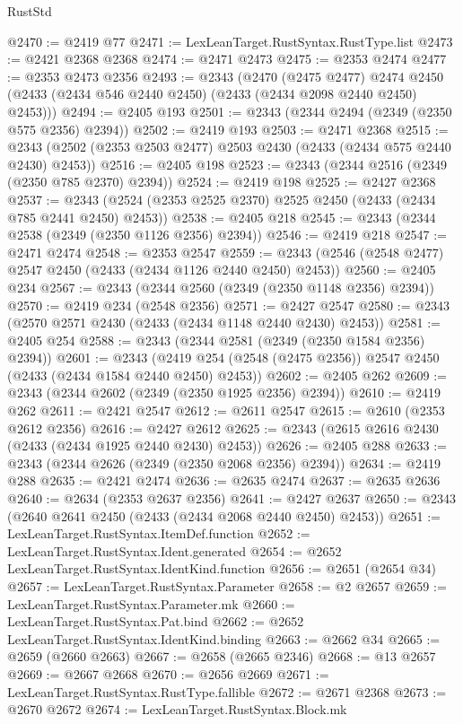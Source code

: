 \begin{lexlean}{RustStd}
\begin{coremodule}
@2470 := @2419 @77
@2471 := LexLeanTarget.RustSyntax.RustType.list
@2473 := @2421 @2368 @2368
@2474 := @2471 @2473
@2475 := @2353 @2474
@2477 := @2353 @2473 @2356
@2493 := @2343
    (@2470
      (@2475 @2477)
      @2474
      @2450
      (@2433 (@2434 @546 @2440 @2450) (@2433 (@2434 @2098 @2440 @2450) @2453)))
@2494 := @2405 @193
@2501 := @2343 (@2344 @2494 (@2349 (@2350 @575 @2356) @2394))
@2502 := @2419 @193
@2503 := @2471 @2368
@2515 := @2343 (@2502 (@2353 @2503 @2477) @2503 @2430 (@2433 (@2434 @575 @2440 @2430) @2453))
@2516 := @2405 @198
@2523 := @2343 (@2344 @2516 (@2349 (@2350 @785 @2370) @2394))
@2524 := @2419 @198
@2525 := @2427 @2368
@2537 := @2343 (@2524 (@2353 @2525 @2370) @2525 @2450 (@2433 (@2434 @785 @2441 @2450) @2453))
@2538 := @2405 @218
@2545 := @2343 (@2344 @2538 (@2349 (@2350 @1126 @2356) @2394))
@2546 := @2419 @218
@2547 := @2471 @2474
@2548 := @2353 @2547
@2559 := @2343 (@2546 (@2548 @2477) @2547 @2450 (@2433 (@2434 @1126 @2440 @2450) @2453))
@2560 := @2405 @234
@2567 := @2343 (@2344 @2560 (@2349 (@2350 @1148 @2356) @2394))
@2570 := @2419 @234 (@2548 @2356)
@2571 := @2427 @2547
@2580 := @2343 (@2570 @2571 @2430 (@2433 (@2434 @1148 @2440 @2430) @2453))
@2581 := @2405 @254
@2588 := @2343 (@2344 @2581 (@2349 (@2350 @1584 @2356) @2394))
@2601 := @2343
    (@2419 @254 (@2548 (@2475 @2356)) @2547 @2450 (@2433 (@2434 @1584 @2440 @2450) @2453))
@2602 := @2405 @262
@2609 := @2343 (@2344 @2602 (@2349 (@2350 @1925 @2356) @2394))
@2610 := @2419 @262
@2611 := @2421 @2547
@2612 := @2611 @2547
@2615 := @2610 (@2353 @2612 @2356)
@2616 := @2427 @2612
@2625 := @2343 (@2615 @2616 @2430 (@2433 (@2434 @1925 @2440 @2430) @2453))
@2626 := @2405 @288
@2633 := @2343 (@2344 @2626 (@2349 (@2350 @2068 @2356) @2394))
@2634 := @2419 @288
@2635 := @2421 @2474
@2636 := @2635 @2474
@2637 := @2635 @2636
@2640 := @2634 (@2353 @2637 @2356)
@2641 := @2427 @2637
@2650 := @2343 (@2640 @2641 @2450 (@2433 (@2434 @2068 @2440 @2450) @2453))
@2651 := LexLeanTarget.RustSyntax.ItemDef.function
@2652 := LexLeanTarget.RustSyntax.Ident.generated
@2654 := @2652 LexLeanTarget.RustSyntax.IdentKind.function
@2656 := @2651 (@2654 @34)
@2657 := LexLeanTarget.RustSyntax.Parameter
@2658 := @2 @2657
@2659 := LexLeanTarget.RustSyntax.Parameter.mk
@2660 := LexLeanTarget.RustSyntax.Pat.bind
@2662 := @2652 LexLeanTarget.RustSyntax.IdentKind.binding
@2663 := @2662 @34
@2665 := @2659 (@2660 @2663)
@2667 := @2658 (@2665 @2346)
@2668 := @13 @2657
@2669 := @2667 @2668
@2670 := @2656 @2669
@2671 := LexLeanTarget.RustSyntax.RustType.fallible
@2672 := @2671 @2368
@2673 := @2670 @2672
@2674 := LexLeanTarget.RustSyntax.Block.mk

\end{coremodule}
\end{lexlean}
